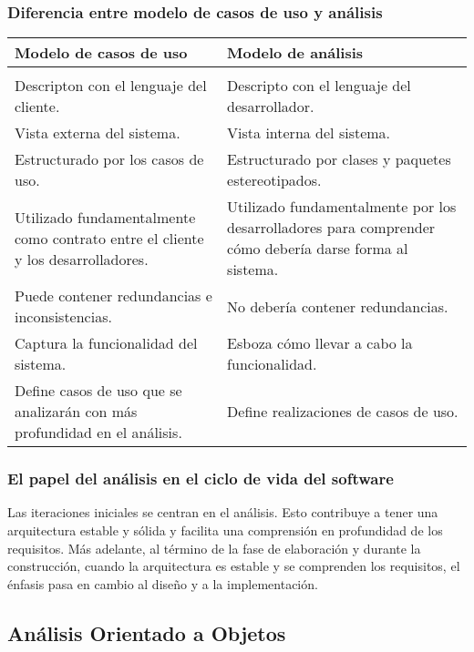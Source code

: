 \subsubsection{Diferencia entre modelo de casos de uso y análisis}
\begin{center}
\begin{tabu}{p{7cm}|p{7cm}}
\rowfont{\bfseries\itshape\large} Modelo de casos de uso & Modelo de análisis\\
\hline
\\[2pt]

Descripton con el lenguaje del cliente. &
Descripto con el lenguaje del desarrollador.\\[2pt]
Vista externa del sistema. &
Vista interna del sistema.\\[2pt]
Estructurado por los casos de uso. &
Estructurado por clases y paquetes estereotipados.\\[2pt]
Utilizado fundamentalmente como contrato entre el cliente y los desarrolladores. &
Utilizado fundamentalmente por los desarrolladores para comprender cómo debería darse forma al sistema.\\[2pt]
Puede contener redundancias e inconsistencias. &
No debería contener redundancias.\\[2pt]
Captura la funcionalidad del sistema.&
Esboza cómo llevar a cabo la funcionalidad.\\[2pt]
Define casos de uso que se analizarán con más profundidad en el análisis. &
Define realizaciones de casos de uso.
\end{tabu}
\end{center}
\subsubsection{El papel del análisis en el ciclo de vida del software}
Las iteraciones iniciales se centran en el análisis. Esto contribuye a tener una arquitectura estable y sólida y facilita una comprensión en profundidad de los requisitos. Más adelante, al término de la fase de elaboración y durante la construcción, cuando la arquitectura es estable y se comprenden los requisitos, el énfasis pasa en cambio al diseño y a la implementación.
\subsection{Análisis Orientado a Objetos}
